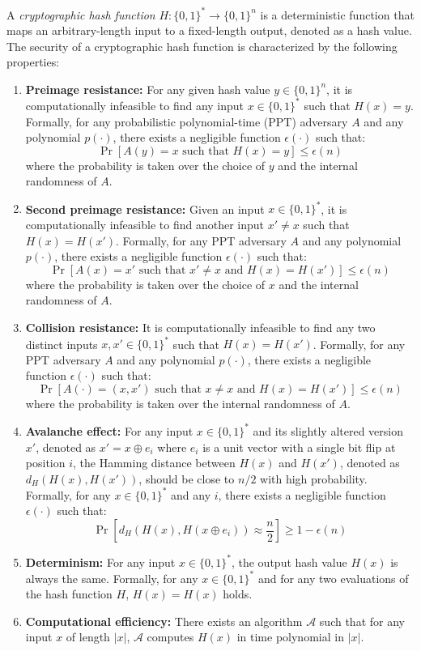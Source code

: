 \documentclass{iacrcc}
\begin{document}
\begin{definition}
A \textit{cryptographic hash function} $H: \{0, 1\}^* \to \{0, 1\}^n$ is a deterministic function that maps an arbitrary-length input to a fixed-length output, denoted as a hash value. The security of a cryptographic hash function is characterized by the following properties:
\begin{enumerate}
\item \textbf{Preimage resistance:} For any given hash value $y \in \{0, 1\}^n$, it is computationally infeasible to find any input $x \in \{0, 1\}^*$ such that $H(x) = y$. Formally, for any probabilistic polynomial-time (PPT) adversary $A$ and any polynomial $p(\cdot)$, there exists a negligible function $\epsilon(\cdot)$ such that:
\[
\Pr[A(y) = x \text{ such that } H(x) = y] \leq \epsilon(n)
\]
where the probability is taken over the choice of $y$ and the internal randomness of $A$.
\item \textbf{Second preimage resistance:} Given an input $x \in \{0, 1\}^*$, it is computationally infeasible to find another input $x' \neq x$ such that $H(x) = H(x')$. Formally, for any PPT adversary $A$ and any polynomial $p(\cdot)$, there exists a negligible function $\epsilon(\cdot)$ such that:
\[
\Pr[A(x) = x' \text{ such that } x' \neq x \text{ and } H(x) = H(x')] \leq \epsilon(n)
\]
where the probability is taken over the choice of $x$ and the internal randomness of $A$.
\item \textbf{Collision resistance:} It is computationally infeasible to find any two distinct inputs $x, x' \in \{0, 1\}^*$ such that $H(x) = H(x')$. Formally, for any PPT adversary $A$ and any polynomial $p(\cdot)$, there exists a negligible function $\epsilon(\cdot)$ such that:
\[
\Pr[A(\cdot) = (x, x') \text{ such that } x \neq x \text{ and } H(x) = H(x')] \leq \epsilon(n)
\]
where the probability is taken over the internal randomness of $A$.
\item \textbf{Avalanche effect:} For any input $x \in \{0, 1\}^*$ and its slightly altered version $x'$, denoted as $x' = x \oplus e_i$ where $e_i$ is a unit vector with a single bit flip at position $i$, the Hamming distance between $H(x)$ and $H(x')$, denoted as $d_H(H(x), H(x'))$, should be close to $n/2$ with high probability. Formally, for any $x \in \{0, 1\}^*$ and any $i$, there exists a negligible function $\epsilon(\cdot)$ such that:
\[
\Pr\left[d_H(H(x), H(x \oplus e_i)) \approx \frac{n}{2}\right] \geq 1 - \epsilon(n)
\]
\item \textbf{Determinism:} For any input $x \in \{0, 1\}^*$, the output hash value $H(x)$ is always the same. Formally, for any $x \in \{0, 1\}^*$ and for any two evaluations of the hash function $H$, $H(x) = H(x)$ holds.
\item \textbf{Computational efficiency:} There exists an algorithm $\mathcal{A}$ such that for any input $x$ of length $|x|$, $\mathcal{A}$ computes $H(x)$ in time polynomial in $|x|$.
\end{enumerate}
\end{definition}
\end{document}
